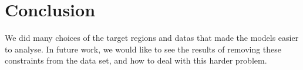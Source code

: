 \section{Conclusion}
\label{sec:conclusion}

We did many choices of the target regions and datas that made the
models easier to analyse. In future work, we would like to see the
results of removing these constraints from the data set, and how to
deal with this harder problem.
